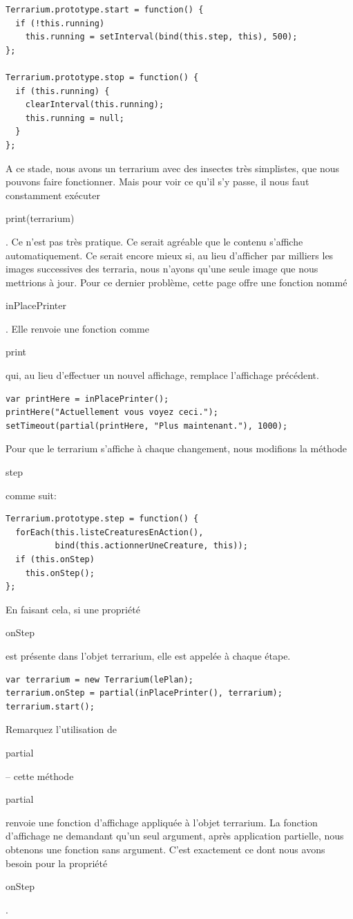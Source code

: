 \documentclass{FramateX}
\renewcommand{\texttt}[1]{\begin{sffamily}{#1}\end{sffamily}}
\begin{document}
\begin{center}\end{center}

\begin{lstlisting}
Terrarium.prototype.start = function() {
  if (!this.running)
    this.running = setInterval(bind(this.step, this), 500);
};

Terrarium.prototype.stop = function() {
  if (this.running) {
    clearInterval(this.running);
    this.running = null;
  }
};
\end{lstlisting}
\begin{center}\end{center}

A ce stade, nous avons un terrarium avec des insectes très simplistes,
que nous pouvons faire fonctionner. Mais pour voir ce qu'il s'y passe,
il nous faut constamment exécuter \texttt{print(terrarium)}. Ce n'est
pas très pratique. Ce serait agréable que le contenu s'affiche
automatiquement. Ce serait encore mieux si, au lieu d'afficher par
milliers les images successives des terraria, nous n'ayons qu'une seule
image que nous mettrions à jour. Pour ce dernier problème, cette page
offre une fonction nommé \texttt{inPlacePrinter}. Elle renvoie une
fonction comme \texttt{print} qui, au lieu d'effectuer un nouvel
affichage, remplace l'affichage précédent.

\begin{lstlisting}
var printHere = inPlacePrinter();
printHere("Actuellement vous voyez ceci.");
setTimeout(partial(printHere, "Plus maintenant."), 1000);
\end{lstlisting}
Pour que le terrarium s'affiche à chaque changement, nous modifions la
méthode \texttt{step} comme suit:

\begin{lstlisting}
Terrarium.prototype.step = function() {
  forEach(this.listeCreaturesEnAction(),
          bind(this.actionnerUneCreature, this));
  if (this.onStep)
    this.onStep();
};
\end{lstlisting}
En faisant cela, si une propriété \texttt{onStep} est présente dans
l'objet terrarium, elle est appelée à chaque étape.

\begin{lstlisting}
var terrarium = new Terrarium(lePlan);
terrarium.onStep = partial(inPlacePrinter(), terrarium);
terrarium.start();
\end{lstlisting}
Remarquez l'utilisation de \texttt{partial} -- cette méthode
\texttt{partial} renvoie une fonction d'affichage appliquée à l'objet
terrarium. La fonction d'affichage ne demandant qu'un seul argument,
après application partielle, nous obtenons une fonction sans argument.
C'est exactement ce dont nous avons besoin pour la propriété
\texttt{onStep}.
\end{document}

